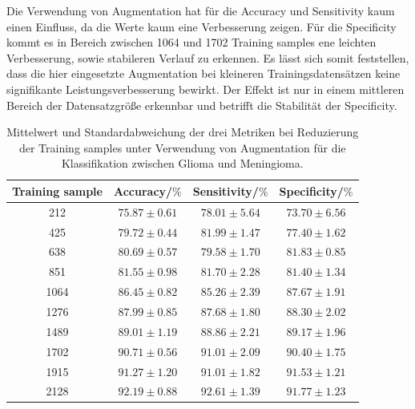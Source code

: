 Die Verwendung von Augmentation hat für die Accuracy und Sensitivity kaum einen Einfluss, da die Werte kaum eine Verbesserung zeigen.
Für die Specificity kommt es in Bereich zwischen 1064 und 1702 Training samples ene leichten Verbesserung, sowie stabileren Verlauf zu erkennen.
Es lässt sich somit feststellen, dass die hier eingesetzte Augmentation bei kleineren Trainingsdatensätzen keine signifikante Leistungsverbesserung bewirkt. 
Der Effekt ist nur in einem mittleren Bereich der Datensatzgröße erkennbar und betrifft die Stabilität der Specificity.
\begin{table}[H]
    \centering
    {\small
        \begin{tabular}{cccc}
            \toprule
            Training sample & Accuracy/$\%$ & Sensitivity/$\%$ & Specificity/$\%$\\
            \midrule
            212  & $75.87 \pm 0.61$ & $78.01 \pm 5.64$ & $ 73.70 \pm 6.56$ \\
            425  & $79.72 \pm 0.44$ & $81.99 \pm 1.47$ & $ 77.40 \pm 1.62$ \\
            638  & $80.69 \pm 0.57$ & $79.58 \pm 1.70$ & $ 81.83 \pm 0.85$ \\
            851  & $81.55 \pm 0.98$ & $81.70 \pm 2.28$ & $ 81.40 \pm 1.34$ \\
            1064 & $86.45 \pm 0.82$ & $85.26 \pm 2.39$ & $ 87.67 \pm 1.91$ \\
            1276 & $87.99 \pm 0.85$ & $87.68 \pm 1.80$ & $ 88.30 \pm 2.02$ \\
            1489 & $89.01 \pm 1.19$ & $88.86 \pm 2.21$ & $ 89.17 \pm 1.96$ \\
            1702 & $90.71 \pm 0.56$ & $91.01 \pm 2.09$ & $ 90.40 \pm 1.75$ \\
            1915 & $91.27 \pm 1.20$ & $91.01 \pm 1.82$ & $ 91.53 \pm 1.21$ \\
            2128 & $92.19 \pm 0.88$ & $92.61 \pm 1.39$ & $ 91.77 \pm 1.23$ \\         
            \bottomrule
        \end{tabular}}
  \caption{Mittelwert und Standardabweichung der drei Metriken bei Reduzierung der Training samples unter Verwendung von Augmentation für die Klassifikation zwischen Glioma und Meningioma.}
  \label{tab:gli-men-augm}
\end{table}
